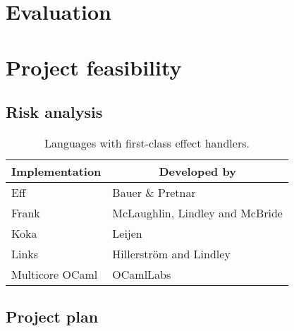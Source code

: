 \section{Evaluation}

\section{Project feasibility}
\subsection{Risk analysis}
\begin{table}[H]
  \centering
  \begin{tabular}{| l | l |}
    \hline
    \multicolumn{1}{|c|}{Implementation} & \multicolumn{1}{c|}{Developed by} \\
    \hline
    Eff & Bauer \& Pretnar \\ 
    \hline
    Frank & McLaughlin, Lindley and McBride \\    
    \hline 
    Koka & Leijen \\
    \hline
    Links & Hillerström and Lindley\\
    \hline
    Multicore OCaml & OCamlLabs \\
    \hline    
  \end{tabular}\caption{Languages with first-class effect handlers.}\label{tbl:efflang}
\end{table}
\subsection{Project plan}